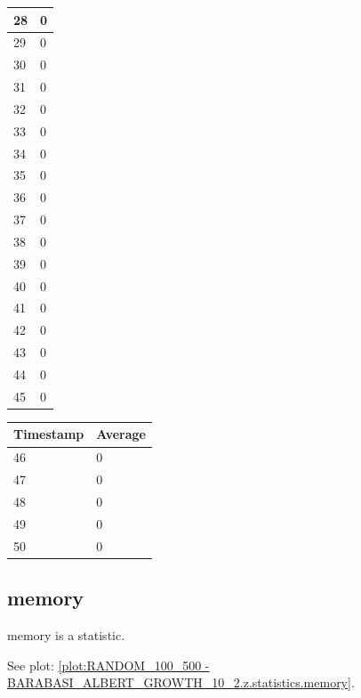 \begin{tabular}{|l||l|}
	28 & 0 \\ \hline
	29 & 0 \\ \hline
	30 & 0 \\ \hline
	31 & 0 \\ \hline
	32 & 0 \\ \hline
	33 & 0 \\ \hline
	34 & 0 \\ \hline
	35 & 0 \\ \hline
	36 & 0 \\ \hline
	37 & 0 \\ \hline
	38 & 0 \\ \hline
	39 & 0 \\ \hline
	40 & 0 \\ \hline
	41 & 0 \\ \hline
	42 & 0 \\ \hline
	43 & 0 \\ \hline
	44 & 0 \\ \hline
	45 & 0 \\ \hline
\end{tabular}
\begin{tabular}{|l||l|}
\hline
	\textbf{Timestamp} & \textbf{Average} \\ \hline
	46 & 0 \\ \hline
	47 & 0 \\ \hline
	48 & 0 \\ \hline
	49 & 0 \\ \hline
	50 & 0 \\ \hline
\end{tabular}

\subsection{memory}
memory is a statistic.

See plot: \ref{plot:RANDOM_100_500 - BARABASI_ALBERT_GROWTH_10_2.z.statistics.memory}.


